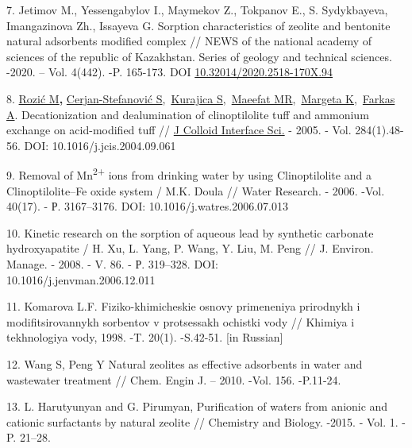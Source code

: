 \begin{references}
7. Jetimov M., Yessengabylov I., Maymekov Z., Tokpanov E., S.
Sydykbayeva, Imangazinova Zh., Issayeva G. Sorption characteristics of
zeolite and bentonite natural adsorbents modified complex // NEWS of the
national academy of sciences of the republic of Kazakhstan. Series of
geology and technical sciences. -2020. -- Vol. 4(442). -P. 165-173. DOI
\href{http://dx.doi.org/10.32014/2020.2518-170X.94}{10.32014/2020.2518-170X.94}

8.
\href{https://www.ncbi.nlm.nih.gov/pubmed/?term=Rozi\%C4\%87\%20M\%5BAuthor\%5D&cauthor=true&cauthor_uid=15752783}{Rozić
M}{\bfseries ,}
\href{https://www.ncbi.nlm.nih.gov/pubmed/?term=Cerjan-Stefanovi\%C4\%87\%20S\%5BAuthor\%5D&cauthor=true&cauthor_uid=15752783}{Cerjan-Stefanović
S},~\href{https://www.ncbi.nlm.nih.gov/pubmed/?term=Kurajica\%20S\%5BAuthor\%5D&cauthor=true&cauthor_uid=15752783}{Kurajica
S},~\href{https://www.ncbi.nlm.nih.gov/pubmed/?term=Maeefat\%20MR\%5BAuthor\%5D&cauthor=true&cauthor_uid=15752783}{Maeefat
MR},~\href{https://www.ncbi.nlm.nih.gov/pubmed/?term=Margeta\%20K\%5BAuthor\%5D&cauthor=true&cauthor_uid=15752783}{Margeta
K},~\href{https://www.ncbi.nlm.nih.gov/pubmed/?term=Farkas\%20A\%5BAuthor\%5D&cauthor=true&cauthor_uid=15752783}{Farkas
A}. Decationization and dealumination of clinoptilolite tuff and
ammonium exchange on acid-modified tuff //
\href{https://www.ncbi.nlm.nih.gov/pubmed/15752783}{J Colloid Interface
Sci.} - 2005. - Vol. 284(1).48-56. DOI: 10.1016/j.jcis.2004.09.061

9. Removal of Mn\textsuperscript{2+} ions from drinking water by using
Clinoptilolite and a Clinoptilolite--Fe oxide system / M.K. Doula //
Water Research. - 2006. -Vol. 40(17). - Р. 3167--3176. DOI:
10.1016/j.watres.2006.07.013

10. Kinetic research on the sorption of aqueous lead by synthetic
carbonate hydroxyapatite / H. Xu, L. Yang, P. Wang, Y. Liu, M. Peng //
J. Environ. Manage. - 2008. - V. 86. - Р. 319--328. DOI:
\\10.1016/j.jenvman.2006.12.011

11. Komarova L.F. Fiziko-khimicheskie osnovy primeneniya prirodnykh i
modifitsirovannykh sorbentov v protsessakh ochistki vody // Khimiya i
tekhnologiya vody, 1998. -T. 20(1). -S.42-51. {[}in Russian{]}

12. Wang S, Peng Y Natural zeolites as effective adsorbents in water and
wastewater treatment // Chem. Engin J. -- 2010. -Vol. 156. -P.11-24.

13. L. Harutyunyan and G. Pirumyan, Purification of waters from anionic
and cationic surfactants by natural zeolite // Chemistry and Biology.
-2015. - Vol. 1. - P. 21--28.


\end{references}
